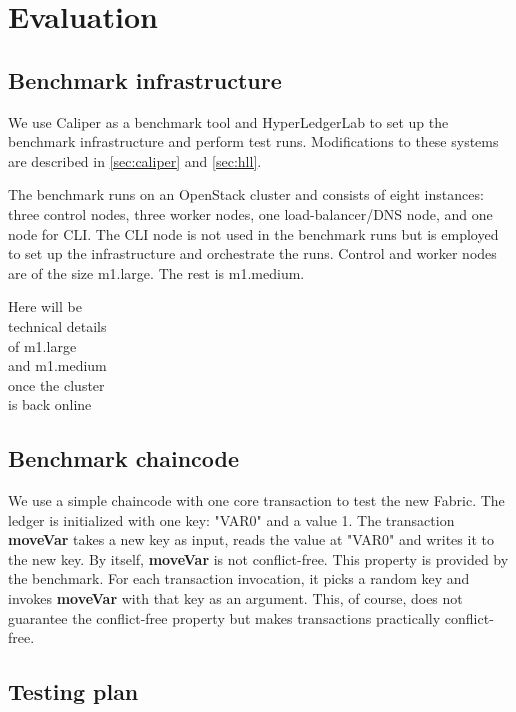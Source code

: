\chapter{Evaluation}
\label{chapter:evaluation}

\section{Benchmark infrastructure}\label{sec:infra}

We use Caliper as a benchmark tool and HyperLedgerLab to set up the benchmark infrastructure and perform test runs. Modifications to these systems are described in \ref{sec:caliper} and \ref{sec:hll}.

The benchmark runs on an OpenStack cluster and consists of eight instances: three control nodes, three worker nodes, one load-balancer/DNS node, and one node for CLI. The CLI node is not used in the benchmark runs but is employed to set up the infrastructure and orchestrate the runs. Control and worker nodes are of the size m1.large. The rest is m1.medium.

{\color{red}Here will be \\technical details\\of m1.large \\and m1.medium \\once the cluster\\ is back online}

\newpage

\section{Benchmark chaincode}\label{sec:benchcode}

We use a simple chaincode with one core transaction to test the new Fabric. The ledger is initialized with one key: "VAR0" and a value 1. The transaction \textbf{moveVar} takes a new key as input, reads the value at "VAR0" and writes it to the new key. By itself,  \textbf{moveVar} is not conflict-free. This property is provided by the benchmark. For each transaction invocation, it picks a random key and invokes \textbf{moveVar} with that key as an argument. This, of course, does not guarantee the conflict-free property but makes transactions practically conflict-free.

\section{Testing plan}\label{sec:testplan}

